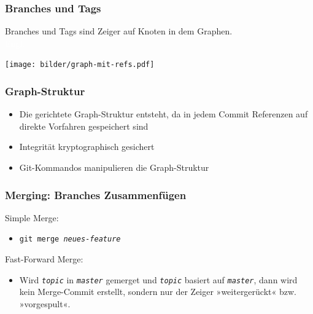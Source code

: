 \documentclass{beamer}
\begin{document}
\begin{frame}
\frametitle{Branches und Tags}



Branches und Tags sind Zeiger auf Knoten in dem Graphen.\\
\textcolor{white}{Engl.}

\begin{center}
\texttt{[image: bilder/graph-mit-refs.pdf]}
\end{center}


\end{frame}
\begin{frame}
\frametitle{Graph-Struktur}



\begin{itemize}
	\item Die gerichtete Graph-Struktur entsteht, da in jedem Commit Referenzen auf direkte Vorfahren gespeichert sind
\end{itemize}

\begin{itemize}
	\item Integrität kryptographisch gesichert
\end{itemize}

\begin{itemize}
	\item Git-Kommandos manipulieren die Graph-Struktur
\end{itemize}


\end{frame}
\begin{frame}
\frametitle{Merging: Branches Zusammenfügen}



Simple Merge:
\begin{itemize}
	\item \texttt{git merge \emph{neues-feature}}
\end{itemize}


\vspace{.5cm}


Fast-Forward Merge:
\begin{itemize}
	\item Wird \texttt{\emph{topic}} in \texttt{\emph{master}} gemerget und \texttt{\emph{topic}} basiert auf \texttt{\emph{master}}, dann wird kein Merge-Commit erstellt, sondern nur der Zeiger »weitergerückt« bzw. »vorgespult«.
\end{itemize}


\end{frame}
\end{document}
